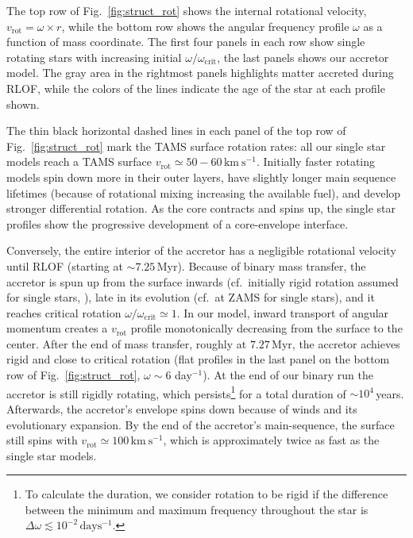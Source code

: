 \documentclass[twocolumn,twocolappendix,trackchanges]{aastex63}
\newcommand{\kms}{{\mathrm{km\ s^{-1}}}}
\DeclareRobustCommand{\Figref}[1]{Fig.~\ref{#1}}
\begin{document}

The top row of \Figref{fig:struct_rot} shows the internal rotational
velocity, $v_\mathrm{rot}=\omega\times r$, while the bottom row shows
the angular frequency profile $\omega$ as a function of mass
coordinate. The first four panels in each row show single rotating
stars with increasing initial $\omega/\omega_\mathrm{crit}$, the last
panels shows our accretor model.  The gray area in the rightmost
panels highlights matter accreted during RLOF, while the colors of the
lines indicate the age of the star at each profile shown.

The thin black horizontal dashed lines in each panel of the top row of
\Figref{fig:struct_rot} mark the TAMS surface rotation rates: all our
single star models reach a TAMS surface
$v_\mathrm{rot}\simeq50-60\,\kms$. Initially faster rotating models
spin down more in their outer layers, have slightly longer main
sequence lifetimes (because of rotational mixing increasing the
available fuel), and develop stronger differential rotation. As the
core contracts and spins up, the single star profiles show the
progressive development of a core-envelope interface.

Conversely, the entire interior of the accretor has a negligible
rotational velocity until RLOF (starting at
$\sim{}7.25$\,Myr). Because of binary mass transfer, the accretor is
spun up from the surface inwards (cf.\ initially rigid rotation assumed
for single stars, \citealt{maeder:00}), late in its evolution (cf.\
at ZAMS for single stars), and it
reaches critical rotation $\omega/\omega_\mathrm{crit}\simeq1$. In our
model, inward transport of angular momentum creates a $v_\mathrm{rot}$
profile monotonically decreasing from the surface to the center. After
the end of mass transfer, roughly at $7.27$\,Myr, the accretor
achieves rigid and close to critical rotation (flat profiles in the
last panel on the bottom row of \Figref{fig:struct_rot},
$\omega \sim 6$ day$^{-1}$). At the end of our binary run the
accretor is still rigidly rotating, which persists\footnote{To calculate
  the duration, we consider rotation to be rigid if the difference
  between the minimum and maximum frequency throughout the star is
  $\Delta \omega \lesssim 10^{-2}\,\mathrm{days^{-1}}$.} for a total
duration of $\sim10^{4}$\,years. Afterwards, the accretor's envelope
spins down because of winds and its evolutionary expansion.  By the
end of the accretor's main-sequence, the surface still spins with
$v_\mathrm{rot}\simeq100\,\kms$, which is approximately twice as fast
as the single star models.
\end{document}
